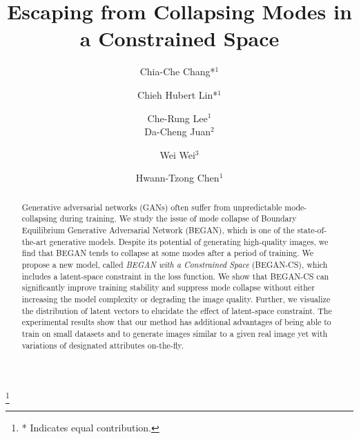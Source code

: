 \documentclass[runningheads]{llncs}
\newcommand\blfootnote[1]{\begingroup
  \renewcommand\thefootnote{}\footnote{#1}\addtocounter{footnote}{-1}\endgroup
}
\begin{document}
\pagestyle{headings}
\mainmatter

\title{Escaping from Collapsing Modes in a Constrained Space} 



\author{
    Chia-Che Chang*$^1$ \and Chieh Hubert Lin*$^1$ \and Che-Rung Lee$^1$ \\
    Da-Cheng Juan$^2$ \and Wei Wei$^3$ \and Hwann-Tzong Chen$^1$
}



\maketitle

\blfootnote{* Indicates equal contribution.}

\begin{abstract}

    Generative adversarial networks (GANs) often suffer from unpredictable mode-collapsing during training. We study the issue of mode collapse of Boundary Equilibrium Generative Adversarial Network (BEGAN), which is one of the state-of-the-art generative models. Despite its potential of generating high-quality images, we find that BEGAN tends to collapse at some modes after a period of training. We propose a new model, called \emph{BEGAN with a Constrained Space} (BEGAN-CS), which includes a latent-space constraint in the loss function. We show that BEGAN-CS can significantly improve training stability and suppress mode collapse without either increasing the model complexity or degrading the image quality. Further, we visualize the distribution of latent vectors to elucidate the effect of latent-space constraint. The experimental results show that our method has additional advantages of being able to train on small datasets and to generate images similar to a given real image yet with variations of designated attributes on-the-fly.
    
\end{abstract}
\end{document}
